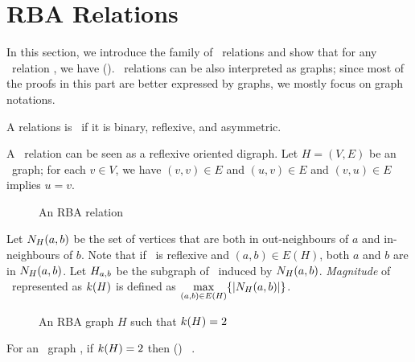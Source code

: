 \section{RBA Relations}
In this section,  we introduce the family of \RBA\ relations and show that
for any \RBA\ relation \mR, we have \cbis \maple \ccsp(\mR)\@.
\RBA\ relations can be also interpreted as graphs; since most of the proofs in this part
are better expressed by graphs, we mostly focus on graph notations.

\begin{defi} [\RBA]
A relations is \RBA\ if it is binary, reflexive, and asymmetric.
\end{defi} 

A \RBA\ relation can be seen as a reflexive oriented digraph. Let \(H=(V,E)\) be 
an \RBA\ graph; for each \(v \in V\), we have \((v,v) \in E\)
and \((u,v) \in E\) and \((v,u) \in E\) implies \(u=v\)\@.

\begin{figure}[h]
\center{}
\caption{An RBA relation}
\end{figure}

Let \(N_{H}({a},{b})\) be the set of vertices that are both in
out-neighbours of \(a\) and in-neighbours of \(b\).
Note that if \mH\ is reflexive and \((a,b)\in E(H)\),
both \(a\) and \(b\) are in \(N_{H}({a},{b})\)\@.
Let \(H_{a,b}\) be the subgraph of \mH\ induced by \(N_{H}({a},{b})\).
\emph{Magnitude} of \mH\ represented as \(k(H)\) is defined as
\(\max \limits_{(a,b) \in E(H)} \{{|N_{H}({a},{b})|}\}\)\@.

\begin{figure}[h]
\center{}
\caption{An RBA graph \ensuremath{H} such that \ensuremath{\magf(H)=2}}
\end{figure}

\begin{lemma} \label{lem:triangle-free}
For an \RBA\ graph \mH, if \(k(H)=2\) then \chom(\mH) \mapge\ \cbis\@.
\end{lemma}

